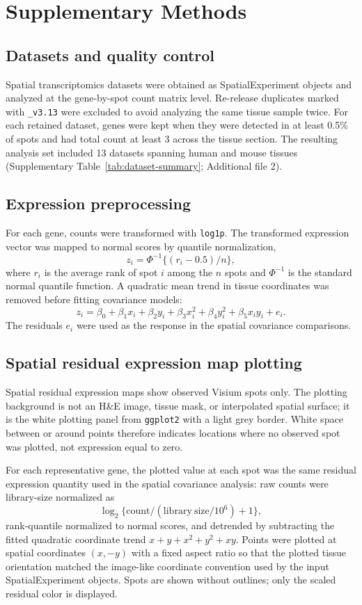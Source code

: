 \clearpage
\section{Supplementary Methods}

\subsection{Datasets and quality control}
Spatial transcriptomics datasets were obtained as SpatialExperiment objects and analyzed at the gene-by-spot count matrix level. Re-release duplicates marked with \texttt{\_v3.13} were excluded to avoid analyzing the same tissue sample twice. For each retained dataset, genes were kept when they were detected in at least 0.5\% of spots and had total count at least 3 across the tissue section. The resulting analysis set included 13 datasets spanning human and mouse tissues (Supplementary Table~\ref{tab:dataset-summary}; Additional file 2).

\subsection{Expression preprocessing}
For each gene, counts were transformed with \texttt{log1p}. The transformed expression vector was mapped to normal scores by quantile normalization,
\[
z_i = \Phi^{-1}\{(r_i - 0.5)/n\},
\]
where \(r_i\) is the average rank of spot \(i\) among the \(n\) spots and \(\Phi^{-1}\) is the standard normal quantile function. A quadratic mean trend in tissue coordinates was removed before fitting covariance models:
\[
z_i = \beta_0 + \beta_1 x_i + \beta_2 y_i + \beta_3 x_i^2 + \beta_4 y_i^2 + \beta_5 x_i y_i + e_i.
\]
The residuals \(e_i\) were used as the response in the spatial covariance comparisons.

\subsection{Spatial residual expression map plotting}
Spatial residual expression maps show observed Visium spots only. The plotting background is not an H\&E image, tissue mask, or interpolated spatial surface; it is the white plotting panel from \texttt{ggplot2} with a light grey border. White space between or around points therefore indicates locations where no observed spot was plotted, not expression equal to zero.

For each representative gene, the plotted value at each spot was the same residual expression quantity used in the spatial covariance analysis: raw counts were library-size normalized as
\[
\log_2\{ \mathrm{count}/(\mathrm{library\ size}/10^6) + 1\},
\]
rank-quantile normalized to normal scores, and detrended by subtracting the fitted quadratic coordinate trend \(x + y + x^2 + y^2 + xy\). Points were plotted at spatial coordinates \((x,-y)\) with a fixed aspect ratio so that the plotted tissue orientation matched the image-like coordinate convention used by the input SpatialExperiment objects. Spots are shown without outlines; only the scaled residual color is displayed.

